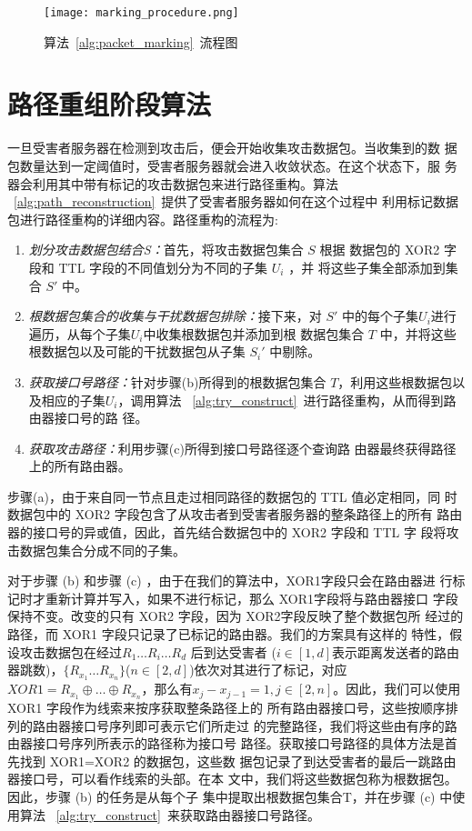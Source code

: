 \begin{figure}[htbp]
  \centering
  \texttt{[image: marking\_procedure.png]}
  \caption{算法~\ref{alg:packet_marking}~流程图}
  \label{fig:marking_procedure}
\end{figure}   

\section{路径重组阶段算法}
一旦受害者服务器在检测到攻击后，便会开始收集攻击数据包。当收集到的数
据包数量达到一定阈值时，受害者服务器就会进入收敛状态。在这个状态下，服
务器会利用其中带有标记的攻击数据包来进行路径重构。算法
~\ref{alg:path_reconstruction}~提供了受害者服务器如何在这个过程中
利用标记数据包进行路径重构的详细内容。路径重构的流程为:



\begin{enumerate}[label=(\alph*).]
  \item \emph{划分攻击数据包结合S：}首先，将攻击数据包集合 $S$ 根据
  数据包的 XOR2 字段和 TTL 字段的不同值划分为不同的子集 $U_i$ ，并
  将这些子集全部添加到集合 $S'$ 中。
  \item \emph{根数据包集合的收集与干扰数据包排除：}接下来，对 $S'$ 
  中的每个子集$U_i$进行遍历，从每个子集$U_i$中收集根数据包并添加到根
  数据包集合 $T$ 中，并将这些根数据包以及可能的干扰数据包从子集 
  $S_i'$ 中剔除。
  \item \emph{获取接口号路径：}针对步骤(b)所得到的根数据包集合 
  $T$，利用这些根数据包以及相应的子集$U_i$，调用算法
  ~\ref*{alg:try_construct}~进行路径重构，从而得到路由器接口号的路
  径。
  \item \emph{获取攻击路径：}利用步骤(c)所得到接口号路径逐个查询路
  由器最终获得路径上的所有路由器。
\end{enumerate}

步骤(a)，由于来自同一节点且走过相同路径的数据包的 TTL 值必定相同，同
时数据包中的 XOR2 字段包含了从攻击者到受害者服务器的整条路径上的所有
路由器的接口号的异或值，因此，首先结合数据包中的 XOR2 字段和 TTL 字
段将攻击数据包集合分成不同的子集。

对于步骤 (b) 和步骤 (c) ，由于在我们的算法中，XOR1字段只会在路由器进
行标记时才重新计算并写入，如果不进行标记，那么 XOR1字段将与路由器接口
字段保持不变。改变的只有 XOR2 字段，因为 XOR2字段反映了整个数据包所
经过的路径，而 XOR1 字段只记录了已标记的路由器。我们的方案具有这样的
特性，假设攻击数据包在经过$ R_1 \dots R_i \dots R_d $ 后到达受害者
($ i \in [1,d] $表示距离发送者的路由器跳数)，$ \{R_{x_1} \dots 
R_{x_n}\}$($n \in [2,d]$)依次对其进行了标记，对应$ XOR1 = R_{x_1}
 \oplus \dots \oplus R_{x_n}$，那么有$x_j - x_{j-1} = 1,j \in 
 [2,n]$。因此，我们可以使用 XOR1 字段作为线索来按序获取整条路径上的
 所有路由器接口号，这些按顺序排列的路由器接口号序列即可表示它们所走过
 的完整路径，我们将这些由有序的路由器接口号序列所表示的路径称为接口号
 路径。获取接口号路径的具体方法是首先找到 XOR1=XOR2 的数据包，这些数
 据包记录了到达受害者的最后一跳路由器接口号，可以看作线索的头部。在本
 文中，我们将这些数据包称为根数据包。因此，步骤 (b) 的任务是从每个子
 集中提取出根数据包集合T，并在步骤 (c) 中使用算法
 ~\ref*{alg:try_construct}~来获取路由器接口号路径。

